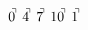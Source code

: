 \documentclass[preview]{standalone}
\begin{document}
\begin{align*}
0^{\hspace{-0.1cm}\urcorner} \ 4^{\hspace{-0.1cm}\urcorner} \ 7^{\hspace{-0.1cm}\urcorner} \ 10^{\hspace{-0.1cm}\urcorner} \ 1^{\hspace{-0.1cm}\urcorner}
\end{align*}
\end{document}
